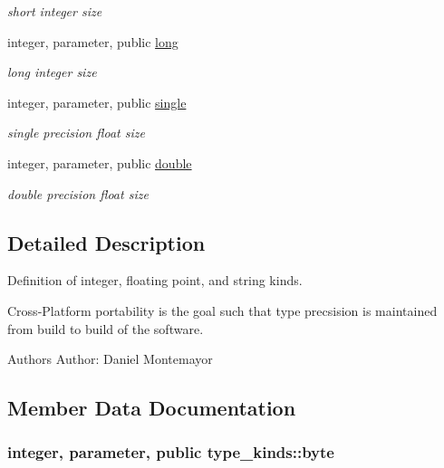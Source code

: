 \begin{DoxyCompactItemize}
\begin{DoxyCompactList}\small\item\em short integer size \end{DoxyCompactList}\item 
integer, parameter, public \hyperlink{classtype__kinds_a14af3c9d56db49c61252b056506a584a}{long}
\begin{DoxyCompactList}\small\item\em long integer size \end{DoxyCompactList}\item 
integer, parameter, public \hyperlink{classtype__kinds_a1752925d569776fd4a88872a620ed1d0}{single}
\begin{DoxyCompactList}\small\item\em single precision float size \end{DoxyCompactList}\item 
integer, parameter, public \hyperlink{classtype__kinds_a34b12277eb02d1bbaaaae83e033d9890}{double}
\begin{DoxyCompactList}\small\item\em double precision float size \end{DoxyCompactList}\end{DoxyCompactItemize}


\subsection{Detailed Description}
Definition of integer, floating point, and string kinds. 

Cross-\/\+Platform portability is the goal such that type precsision is maintained from build to build of the software. \begin{DoxyAuthor}{Authors}
Author\+: Daniel Montemayor 
\end{DoxyAuthor}


\subsection{Member Data Documentation}
\hypertarget{classtype__kinds_a13366a08a0935a72c203e1b880b4d49e}{
\subsubsection[{byte}]{\setlength{\rightskip}{0pt plus 5cm}integer, parameter, public type\+\_\+kinds\+::byte}}\label{classtype__kinds_a13366a08a0935a72c203e1b880b4d49e}


